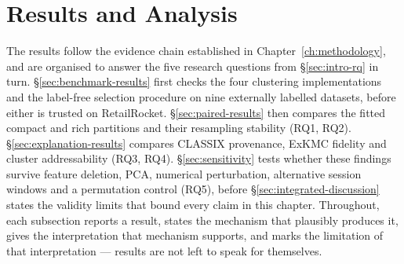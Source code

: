 \chapter{Results and Analysis}
\label{ch:results}

The results follow the evidence chain established in Chapter~\ref{ch:methodology}, and are organised to answer the five research questions from \S\ref{sec:intro-rq} in turn. \S\ref{sec:benchmark-results} first checks the four clustering implementations and the label-free selection procedure on nine externally labelled datasets, before either is trusted on RetailRocket. \S\ref{sec:paired-results} then compares the fitted compact and rich partitions and their resampling stability (RQ1, RQ2). \S\ref{sec:explanation-results} compares CLASSIX provenance, ExKMC fidelity and cluster addressability (RQ3, RQ4). \S\ref{sec:sensitivity} tests whether these findings survive feature deletion, PCA, numerical perturbation, alternative session windows and a permutation control (RQ5), before \S\ref{sec:integrated-discussion} states the validity limits that bound every claim in this chapter. Throughout, each subsection reports a result, states the mechanism that plausibly produces it, gives the interpretation that mechanism supports, and marks the limitation of that interpretation — results are not left to speak for themselves.





